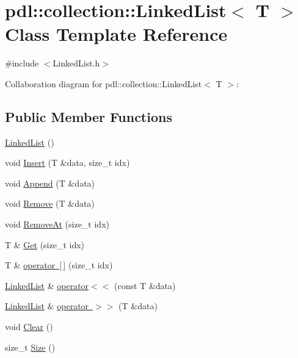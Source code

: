 \hypertarget{classpdl_1_1collection_1_1_linked_list}{}\section{pdl\+::collection\+::Linked\+List$<$ T $>$ Class Template Reference}
\label{classpdl_1_1collection_1_1_linked_list}


{\ttfamily \#include $<$Linked\+List.\+h$>$}



Collaboration diagram for pdl\+::collection\+::Linked\+List$<$ T $>$\+:
\subsection*{Public Member Functions}
\begin{DoxyCompactItemize}
\item 
\mbox{\hyperlink{classpdl_1_1collection_1_1_linked_list_afe7f78983e173f8018927cf2ad11a5aa}{Linked\+List}} ()
\item 
void \mbox{\hyperlink{classpdl_1_1collection_1_1_linked_list_a478953321bd845ad68ad5a9ed7099107}{Insert}} (T \&data, size\+\_\+t idx)
\item 
void \mbox{\hyperlink{classpdl_1_1collection_1_1_linked_list_a3964123b90998cea595c10d100aa4a5e}{Append}} (T \&data)
\item 
void \mbox{\hyperlink{classpdl_1_1collection_1_1_linked_list_aaf58dfcc200a78f9e6144661cc8bb092}{Remove}} (T \&data)
\item 
void \mbox{\hyperlink{classpdl_1_1collection_1_1_linked_list_a2fcd40e9bcdf71f6acd2bb79fe8eacde}{Remove\+At}} (size\+\_\+t idx)
\item 
T \& \mbox{\hyperlink{classpdl_1_1collection_1_1_linked_list_a7544f02aaf2790960f2191fd4d137764}{Get}} (size\+\_\+t idx)
\item 
T \& \mbox{\hyperlink{classpdl_1_1collection_1_1_linked_list_a2a423e07aaafdb74ae9b5d72ebb4d025}{operator \mbox{[}$\,$\mbox{]}}} (size\+\_\+t idx)
\item 
\mbox{\hyperlink{classpdl_1_1collection_1_1_linked_list}{Linked\+List}} \& \mbox{\hyperlink{classpdl_1_1collection_1_1_linked_list_a0e4a9cc77ee954f9d1d3e3dc8f41bbbe}{operator$<$$<$}} (const T \&data)
\item 
\mbox{\hyperlink{classpdl_1_1collection_1_1_linked_list}{Linked\+List}} \& \mbox{\hyperlink{classpdl_1_1collection_1_1_linked_list_aad3fc3e875b9b06582ae6ac020e30281}{operator $>$$>$}} (T \&data)
\item 
void \mbox{\hyperlink{classpdl_1_1collection_1_1_linked_list_a3d56da0f6e395184f18996fdbe6f493f}{Clear}} ()
\item 
size\+\_\+t \mbox{\hyperlink{classpdl_1_1collection_1_1_linked_list_a1262de4a576f36a22c286005e00e0a1f}{Size}} ()
\end{DoxyCompactItemize}
